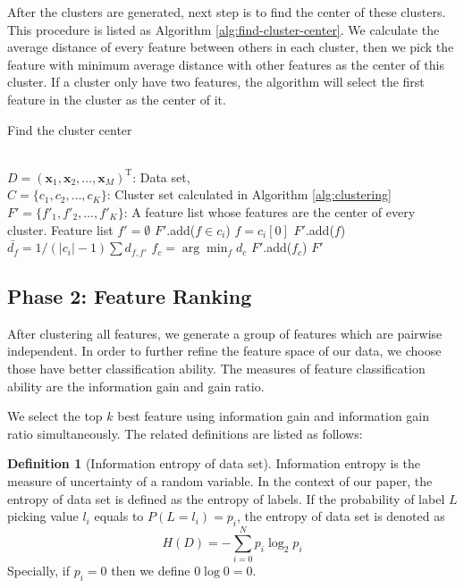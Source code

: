 \documentclass{ieeeaccess}
\theoremstyle{definition}
\newtheorem{defn}{Definition}
\begin{document}
After the clusters are generated, next step is to find the center of these clusters. This procedure is listed as Algorithm \ref{alg:find-cluster-center}. We calculate the average distance of every feature between others in each cluster, then we pick the feature with minimum average distance with other features as the center of this cluster. If a cluster only have two features, the algorithm will select the first feature in the cluster as the center of it.

\begin{algorithm}
    \caption{Find the cluster center}
    \label{alg:find-cluster-center}
    \begin{algorithmic}[1]
    \REQUIRE ~~\\
        $D=(\bm{x}_1,\bm{x}_2,\ldots,\bm{x}_M)^\text{T}$: Data set, \\
        $C=\{c_1, c_2, \ldots, c_K\}$: Cluster set calculated in Algorithm \ref{alg:clustering}
    \ENSURE ~~\\
        $F'=\{f'_1, f'_2, \ldots, f'_K\}$: A feature list whose features are the center of every cluster.
    \STATE Feature list $f'=\emptyset$
            \STATE $F'$.add($f \in c_i$)
                \STATE $f=c_i[0]$
                \STATE $F'$.add($f$)
        \ELSE
                \STATE $\bar{d_f}=1/(|c_i|-1)\sum d_{f, f'}$
            \ENDFOR
            \STATE $f_c=\arg\min_f d_c$
            \STATE $F'$.add($f_c$)
        \ENDIF
    \ENDFOR
    \RETURN $F'$
    \end{algorithmic}
\end{algorithm}
        

\subsection{Phase 2: Feature Ranking}

After clustering all features, we generate a group of features which are pairwise independent. In order to further refine the feature space of our data, we choose those have better classification ability. The measures of feature classification ability are the information gain and gain ratio.

We select the top $k$ best feature using information gain and information gain ratio simultaneously. The related definitions are listed as follows:

\begin{defn}[Information entropy of data set]
    Information entropy\cite{Shannon1948} is the measure of uncertainty of a random variable. In the context of our paper, the entropy of data set is defined as the entropy of labels. If the probability of label $L$ picking value $l_i$ equals to $P(L=l_i)=p_i$, the entropy of data set is denoted as
\begin{equation}
    H(D) = -\sum_{i=0}^N p_i \log_2 p_i
\end{equation}
    Specially, if $p_i=0$ then we define $0\log0 = 0$.
\end{defn}
\end{document}
